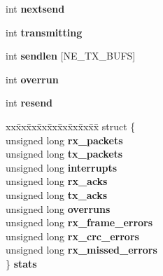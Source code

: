 \begin{DoxyCompactItemize}
\mbox{\label{structne__softc_a861d7f7693309749ebf475a18fb234db}} 
int {\bfseries nextsend}
\item 
\mbox{\label{structne__softc_a1de7a437ba2a96dd9792fe822641230a}} 
int {\bfseries transmitting}
\item 
\mbox{\label{structne__softc_afc2b47130dc8691ec664e66ac5d204c7}} 
int {\bfseries sendlen} \mbox{[}N\+E\+\_\+\+T\+X\+\_\+\+B\+U\+FS\mbox{]}
\item 
\mbox{\label{structne__softc_a49129b5bc758474273bf1382956879f5}} 
int {\bfseries overrun}
\item 
\mbox{\label{structne__softc_ab48eff779662b48bc4177b2206851fc5}} 
int {\bfseries resend}
\item 
\mbox{\label{structne__softc_a9d7fc52917167267497e0b6c76c49c66}} 
\begin{tabbing}
xx\=xx\=xx\=xx\=xx\=xx\=xx\=xx\=xx\=\kill
struct \{\\
\>unsigned long {\bfseries rx\_packets}\\
\>unsigned long {\bfseries tx\_packets}\\
\>unsigned long {\bfseries interrupts}\\
\>unsigned long {\bfseries rx\_acks}\\
\>unsigned long {\bfseries tx\_acks}\\
\>unsigned long {\bfseries overruns}\\
\>unsigned long {\bfseries rx\_frame\_errors}\\
\>unsigned long {\bfseries rx\_crc\_errors}\\
\>unsigned long {\bfseries rx\_missed\_errors}\\
\} {\bfseries stats}\\


\end{tabbing}
\end{DoxyCompactItemize}

